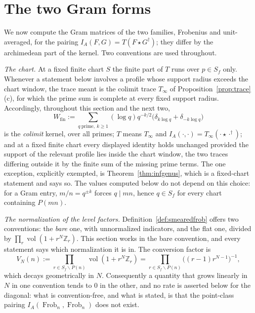\documentclass[11pt]{amsart}
\theoremstyle{definition}
\theoremstyle{remark}
\newcommand{\Z}{\mathbb Z}
\newcommand{\Frob}{\operatorname{Frob}}
\newcommand{\vol}{\operatorname{vol}}
\newcommand{\Wfin}{W_{\mathrm{fin}}}
\begin{document}
\section{The two Gram forms}\label{sec:gram}

We now compute the Gram matrices of the two families, Frobenius and
unit-averaged, for the pairing $I_A(F,G)=T(F\star G^\dagger)$; they differ by
the archimedean part of the kernel.  Two conventions are used throughout.

\emph{The chart.}  At a fixed finite chart $S$ the finite part
of $T$ runs over $p\in S_f$ only. Whenever a statement below involves a profile
whose support radius exceeds the chart window, the trace meant is the colimit
trace $T_\infty$ of Proposition~\ref{prop:trace}(c), for which the prime sum is
complete at every fixed support radius. Accordingly, throughout this section
and the next two,
\[
  \Wfin:=\sum_{q\ \mathrm{prime},\ k\ge1}(\log q)q^{-k/2}
    \bigl(\delta_{k\log q}+\delta_{-k\log q}\bigr)
\]
is the \emph{colimit} kernel, over all primes; $T$ means $T_\infty$ and
$I_A(\cdot,\cdot)=T_\infty(\cdot\star\cdot^\dagger)$; and at a fixed finite
chart every displayed identity holds unchanged provided the support of the
relevant profile lies inside the chart window, the two traces differing outside
it by the finite sum of the missing prime terms. The one exception, explicitly
exempted, is Theorem~\ref{thm:infgenus}, which is a fixed-chart statement and
says so.  The values computed below do not depend on this choice: for a Gram
entry, $m/n=q^{\pm k}$ forces $q\mid mn$, hence $q\in S_f$ for every chart
containing $P(mn)$.

\emph{The normalization of the level factors.}
Definition~\ref{def:smearedfrob} offers two conventions: the \emph{bare} one,
with unnormalized indicators, and the flat one, divided by
$\prod_r\vol(1+r^N\Z_r)$. This section works in the bare convention, and every
statement says which normalization it is in. The conversion factor is
\begin{equation}\label{eq:VN}
  V_N(n):=\prod_{r\in S_f\smallsetminus P(n)}\vol(1+r^N\Z_r)
   =\prod_{r\in S_f\smallsetminus P(n)}\bigl((r-1)r^{N-1}\bigr)^{-1},
\end{equation}
which decays geometrically in $N$. Consequently a quantity that grows linearly
in $N$ in one convention tends to $0$ in the other, and no rate is asserted
below for the diagonal: what is convention-free, and what is stated, is that
the point-class pairing $I_A(\Frob_n,\Frob_n)$ does not exist.
\end{document}
